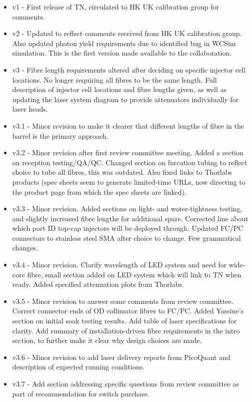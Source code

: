 \documentclass[a4paper,11pt]{article}
\begin{document}
\begin{itemize}
\item v1 - First release of TN, circulated to HK UK calibration group for comments.
\item v2 - Updated to reflect comments received from HK UK calibration group. Also updated photon yield requirements due to identified bug in WCSim simulation. This is the first version made available to the collaboration.
\item v3 - Fibre length requirements altered after deciding on specific injector cell locations. No longer requiring all fibres to be the same length. Full description of injector cell locations and fibre lengths given, as well as updating the laser system diagram to provide attenuators individually for laser heads.
\item v3.1 - Minor revision to make it clearer that different lengths of fibre in the barrel is the primary approach.
\item v3.2 - Minor revision after first review committee meeting. Added a section on reception testing/QA/QC. Changed section on furcation tubing to reflect choice to tube all fibres, this was outdated. Also fixed links to Thorlabs products (spec sheets seem to generate limited-time URLs, now directing to the product page from which the spec sheets are linked). 
\item v3.3 - Minor revision. Added sections on light- and water-tightness testing, and slightly increased fibre lengths for additional spare. Corrected line about which port ID top-cap injectors will be deployed through. Updated FC/PC connectors to stainless steel SMA after choice to change. Few grammatical changes.
\item v3.4 - Minor revision. Clarify wavelength of LED system and need for wide-core fibre, small section added on LED system which will link to TN when ready. Added specified attenuation plots from Thorlabs.
\item v3.5 - Minor revision to answer some comments from review committee. Correct connector ends of OD collimator fibres to FC/PC. Added Yassine's section on initial soak testing results. Add table of laser specifications for clarity. Add summary of installation-driven fibre requirements in the intro section, to further make it clear why design choices are made.
\item v3.6 - Minor revision to add laser delivery reports from PicoQuant and description of expected running conditions.
\item v3.7 - Add section addressing specific questions from review committee as part of recommendation for switch purchase.

\end{itemize}
\end{document}
